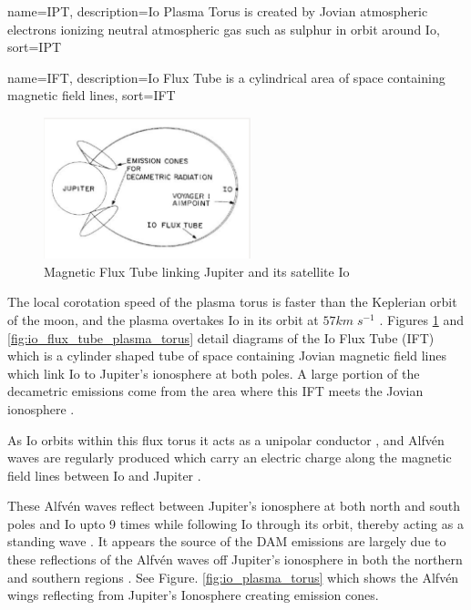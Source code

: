 \documentclass[runningheads,a4paper]{llncs}
\begin{document}
%
{
  name={IPT},
  description={Io Plasma Torus is created by Jovian atmospheric electrons ionizing neutral atmospheric gas such as sulphur in orbit around Io},
  sort=IPT
}
%

%
{
  name={IFT},
  description={Io Flux Tube is a cylindrical area of space containing magnetic field lines},
  sort=IFT
}
%

%
\begin{figure}[here]
\centering
\includegraphics[width=6cm]{images/03}
\caption{Magnetic Flux Tube linking Jupiter and its satellite Io \citep{belcher87}}
\label{fig:io_flux_tube}
\end{figure}
%

The local corotation speed of the plasma torus is faster than the Keplerian orbit of the moon, and the plasma overtakes Io in its orbit at \begin{math} 57 km\;s^{-1} \end{math} \citep{belcher87}. Figures \ref{fig:io_flux_tube} and \ref{fig:io_flux_tube_plasma_torus} detail diagrams of the Io Flux Tube (\gls{IFT}) which is a cylinder shaped tube of space containing Jovian magnetic field lines \citep{belcher87} which link Io to Jupiter's ionosphere at both poles. A large portion of the decametric emissions come from the area where this \gls{IFT} meets the Jovian ionosphere \citep{belcher87}. 

As Io orbits within this flux torus it acts as a unipolar conductor \citep{bose08}, and Alfv\'en waves are regularly produced which carry an electric charge along the magnetic field lines between Io and Jupiter \citep{bose08}.

These Alfv\'en waves reflect between Jupiter's ionosphere at both north and south poles and Io upto 9 times \citep{bose08} while following Io through its orbit, thereby acting as a standing wave \citep{bose08}. It appears the source of the \gls{DAM} emissions are largely due to these reflections of the Alfv\'en waves off Jupiter's ionosphere in both the northern and southern regions \citep{bose08}. See Figure. \ref{fig:io_plasma_torus} which shows the Alfv\'en wings reflecting from Jupiter's Ionosphere creating emission cones.
\end{document}

